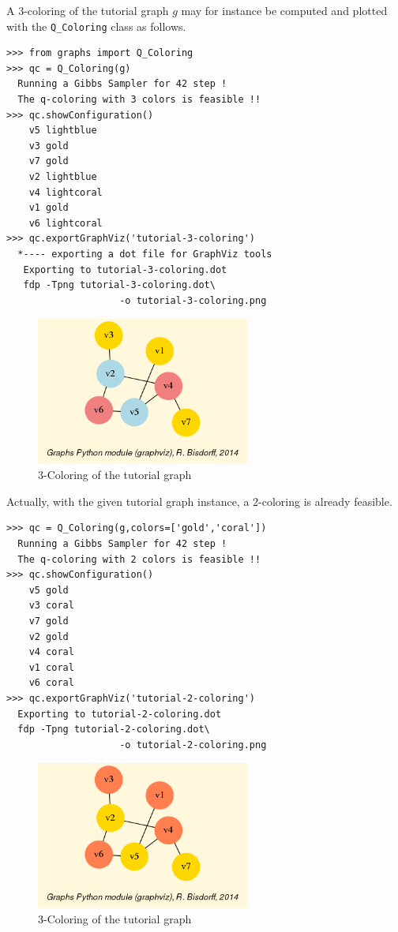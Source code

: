 A 3-coloring of the tutorial graph $g$ may for instance be computed and plotted with the \texttt{Q\_Coloring} class as follows.
\begin{lstlisting}
>>> from graphs import Q_Coloring
>>> qc = Q_Coloring(g)
  Running a Gibbs Sampler for 42 step !
  The q-coloring with 3 colors is feasible !!
>>> qc.showConfiguration()
    v5 lightblue
    v3 gold
    v7 gold
    v2 lightblue
    v4 lightcoral
    v1 gold
    v6 lightcoral
>>> qc.exportGraphViz('tutorial-3-coloring')
  *---- exporting a dot file for GraphViz tools
   Exporting to tutorial-3-coloring.dot
   fdp -Tpng tutorial-3-coloring.dot\
                    -o tutorial-3-coloring.png
\end{lstlisting}
\begin{figure}[h]
\sidecaption
\includegraphics[width=7cm]{Figures/tutorial-3-coloring.png}
\caption{3-Coloring of the tutorial graph} 
\label{fig:22.2}       %
\end{figure}

Actually, with the given tutorial graph instance, a 2-coloring is already feasible.
\begin{lstlisting}
>>> qc = Q_Coloring(g,colors=['gold','coral'])
  Running a Gibbs Sampler for 42 step !
  The q-coloring with 2 colors is feasible !!
>>> qc.showConfiguration()
    v5 gold
    v3 coral
    v7 gold
    v2 gold
    v4 coral
    v1 coral
    v6 coral
>>> qc.exportGraphViz('tutorial-2-coloring')
  Exporting to tutorial-2-coloring.dot
  fdp -Tpng tutorial-2-coloring.dot\
                    -o tutorial-2-coloring.png
\end{lstlisting}
\begin{figure}[h]
\sidecaption
\includegraphics[width=7cm]{Figures/tutorial-2-coloring.png}
\caption{3-Coloring of the tutorial graph} 
\label{fig:22.3}       %
\end{figure}

